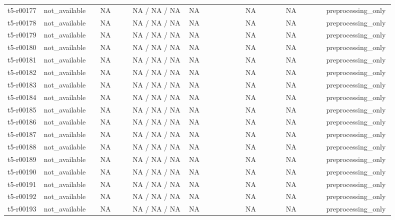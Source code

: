\begin{longtable}{@{}p{0.09\linewidth}p{0.14\linewidth}p{0.08\linewidth}p{0.14\linewidth}p{0.14\linewidth}p{0.1\linewidth}p{0.1\linewidth}p{0.11\linewidth}@{}}
t5-r00177 & not\_\allowbreak{}available & NA & NA / NA / NA & NA & NA & NA & preprocessing\_\allowbreak{}only \\
t5-r00178 & not\_\allowbreak{}available & NA & NA / NA / NA & NA & NA & NA & preprocessing\_\allowbreak{}only \\
t5-r00179 & not\_\allowbreak{}available & NA & NA / NA / NA & NA & NA & NA & preprocessing\_\allowbreak{}only \\
t5-r00180 & not\_\allowbreak{}available & NA & NA / NA / NA & NA & NA & NA & preprocessing\_\allowbreak{}only \\
t5-r00181 & not\_\allowbreak{}available & NA & NA / NA / NA & NA & NA & NA & preprocessing\_\allowbreak{}only \\
t5-r00182 & not\_\allowbreak{}available & NA & NA / NA / NA & NA & NA & NA & preprocessing\_\allowbreak{}only \\
t5-r00183 & not\_\allowbreak{}available & NA & NA / NA / NA & NA & NA & NA & preprocessing\_\allowbreak{}only \\
t5-r00184 & not\_\allowbreak{}available & NA & NA / NA / NA & NA & NA & NA & preprocessing\_\allowbreak{}only \\
t5-r00185 & not\_\allowbreak{}available & NA & NA / NA / NA & NA & NA & NA & preprocessing\_\allowbreak{}only \\
t5-r00186 & not\_\allowbreak{}available & NA & NA / NA / NA & NA & NA & NA & preprocessing\_\allowbreak{}only \\
t5-r00187 & not\_\allowbreak{}available & NA & NA / NA / NA & NA & NA & NA & preprocessing\_\allowbreak{}only \\
t5-r00188 & not\_\allowbreak{}available & NA & NA / NA / NA & NA & NA & NA & preprocessing\_\allowbreak{}only \\
t5-r00189 & not\_\allowbreak{}available & NA & NA / NA / NA & NA & NA & NA & preprocessing\_\allowbreak{}only \\
t5-r00190 & not\_\allowbreak{}available & NA & NA / NA / NA & NA & NA & NA & preprocessing\_\allowbreak{}only \\
t5-r00191 & not\_\allowbreak{}available & NA & NA / NA / NA & NA & NA & NA & preprocessing\_\allowbreak{}only \\
t5-r00192 & not\_\allowbreak{}available & NA & NA / NA / NA & NA & NA & NA & preprocessing\_\allowbreak{}only \\
t5-r00193 & not\_\allowbreak{}available & NA & NA / NA / NA & NA & NA & NA & preprocessing\_\allowbreak{}only \\

\end{longtable}
